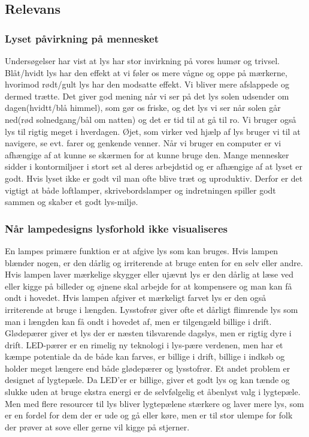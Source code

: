 \subsection{Relevans}
\subsubsection{Lyset påvirkning på mennesket}

Undersøgelser har vist at lys har stor invirkning på vores humør og trivsel.
Blåt/hvidt lys har den effekt at vi føler os mere vågne og oppe på mærkerne\cite{videnskab_dk_paavirkning}, hvorimod rødt/gult lys har den modsatte effekt. Vi bliver mere afslappede og dermed trætte. Det giver god mening når vi ser på det lys solen udsender om dagen(hvidtt/blå himmel), som gør os friske, og det lys vi ser når solen går ned(rød solnedgang/bål om natten) og det er tid til at gå til ro. Vi bruger også lys til rigtig meget i hverdagen. Øjet, som virker ved hjælp af lys bruger vi til at navigere, se evt. farer og genkende venner. Når vi bruger en computer er vi afhængige af at kunne se skærmen for at kunne bruge den. Mange mennesker sidder i kontormiljøer i stort set al deres arbejdstid og er afhængige af at lyset er godt. Hvis lyset ikke er godt vil man ofte blive træt og uproduktiv. Derfor er det vigtigt at både loftlamper, skrivebordslamper og indretningen spiller godt sammen og skaber et godt lys-miljø.


\subsubsection{Når lampedesigns lysforhold ikke visualiseres}

En lampes primære funktion er at afgive lys som kan bruges. Hvis lampen blænder nogen, er den dårlig og irriterende at bruge enten for en selv eller andre. Hvis lampen laver mærkelige skygger eller ujævnt lys er den dårlig at læse ved eller kigge på billeder og øjnene skal arbejde for at kompensere og man kan få ondt i hovedet. Hvis lampen afgiver et mærkeligt farvet lys er den også irriterende at bruge i længden. Lysstofrør giver ofte et dårligt flimrende lys som man i længden kan få ondt i hovedet af, men er tilgengæld billige i drift. Glødepærer giver et lys der er næsten tilsvarende dagslys, men er rigtig dyre i drift\cite{videnskab_dk_led}. LED-pærer er en rimelig ny teknologi i lys-pære verdenen, men har et kæmpe potentiale da de både kan farves, er billige i drift, billige i indkøb og holder meget længere end både glødepærer og lysstofrør. Et andet problem er designet af lygtepæle. Da LED'er er billige, giver et godt lys og kan tænde og slukke uden at bruge ekstra energi er de selvfølgelig et åbenlyst valg i lygtepæle. Men med flere resourcer til lys bliver lygtepælene stærkere og laver mere lys, som er en fordel for dem der er ude og gå eller køre, men er til stor ulempe for folk der prøver at sove eller gerne vil kigge på stjerner\cite{dr_dk_lysforurening}.